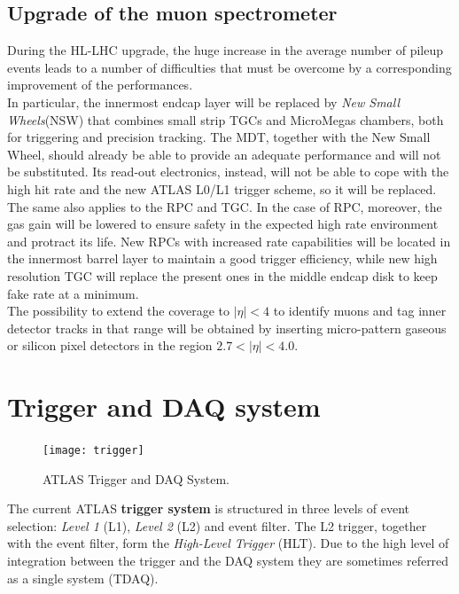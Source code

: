 \documentclass[a4paper,twoside,12pt]{book}
\begin{document}
\subsection*{Upgrade of the muon spectrometer}
During the HL-LHC upgrade, the huge increase in the average number of pileup events leads to a number of difficulties that must be overcome by a corresponding improvement of the performances\cite{scoping}.\\

In particular, the innermost endcap layer will be replaced by \textit{New Small Wheels}(NSW) that combines small strip TGCs and MicroMegas chambers, both for triggering and 
precision tracking. The MDT, together with the New Small Wheel, should already be able to provide an adequate performance and will not be substituted. Its read-out electronics, instead, will not 
be able to cope with the high hit rate and the new ATLAS L0/L1 trigger scheme, so it will be replaced. The same also applies to the RPC and TGC. In the case of RPC, moreover,
the gas gain will be lowered to ensure safety in the expected high rate environment and protract its life. New RPCs with increased rate capabilities will be located in the innermost barrel layer to maintain a
good trigger efficiency, while new high resolution TGC will replace the present ones in the middle endcap disk to keep fake rate at a minimum.\\

The possibility to extend the coverage to $|\eta| < 4$ to identify muons and tag inner detector tracks in that range will be obtained by inserting micro-pattern gaseous or silicon pixel
detectors in the region $2.7 < |\eta| < 4.0$.

\section{Trigger and DAQ system}

\begin{figure} [h]
	\centering
	\texttt{[image: trigger]}
	\caption{ATLAS Trigger and DAQ System\cite{Green:2010zza}.}
	\label{fig:trigger}
\end{figure}

The current ATLAS \textbf{trigger system} is structured in three levels of event selection: \textit{Level 1} (L1), \textit{Level 2} (L2) and event filter\cite{Aad:2008zzm}. The L2 trigger, together
with the event filter, form the \textit{High-Level Trigger} (HLT). Due to the high level of integration between the trigger and the DAQ system they are sometimes referred as a single system (TDAQ).\\
\end{document}
